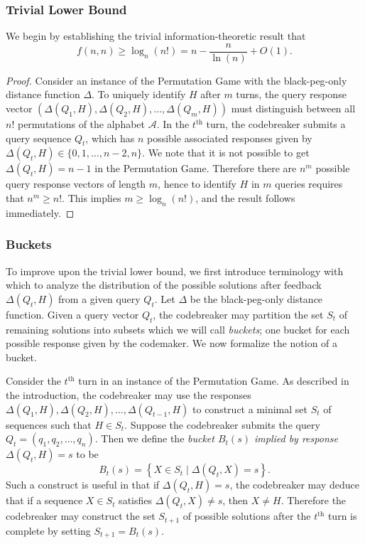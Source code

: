 \documentclass[12pt, a4paper]{article}
\newcommand{\nth}{^{\text{th}}}       %
\begin{document}
	\subsubsection{Trivial Lower Bound}
	We begin by establishing the trivial information-theoretic result that
	\begin{equation*}
		f(n, n)\ge \log_{n}(n!) = n-\frac{n}{\ln(n)}+O(1).
	\end{equation*}
	\begin{proof}
		Consider an instance of the Permutation Game with the black-peg-only distance function $\Delta$. To uniquely identify $H$ after $m$ turns, the query response vector $(\Delta(Q_1, H), \Delta(Q_2, H), \ldots, \Delta(Q_m, H))$ must distinguish between all $n!$ permutations of the alphabet $\mathcal{A}$. In the $t\nth$ turn, the codebreaker submits a query sequence $Q_t$, which has $n$ possible associated responses given by $\Delta(Q_t, H)\in\{0, 1, \ldots, n-2, n\}$. We note that it is not possible to get $\Delta(Q_t, H)=n-1$ in the Permutation Game. Therefore there are $n^m$ possible query response vectors of length $m$, hence to identify $H$ in $m$ queries requires that $n^m\ge n!$. This implies $m\ge\log_n(n!)$, and the result follows immediately.
	\end{proof}

	\subsubsection{Buckets}
	To improve upon the trivial lower bound, we first introduce terminology with which to analyze the distribution of the possible solutions after feedback $\Delta(Q_t, H)$ from a given query $Q_t$. Let $\Delta$ be the black-peg-only distance function. Given a query vector $Q_t$, the codebreaker may partition the set $S_t$ of remaining solutions into subsets which we will call \textit{buckets}; one bucket for each possible response given by the codemaker. We now formalize the notion of a bucket.
	
	Consider the $t\nth$ turn in an instance of the Permutation Game. As described in the introduction, the codebreaker may use the responses $\Delta(Q_1, H), \Delta(Q_2, H), \ldots, \Delta(Q_{t-1}, H)$ to construct a minimal set $S_t$ of sequences such that $H\in S_t$. Suppose the codebreaker submits the query $Q_t = (q_1, q_2, \ldots, q_n)$. Then we define the \textit{bucket $B_t(s)$ implied by response $\Delta(Q_t, H)=s$} to be
	\begin{equation*}
		B_t(s) = \left\{X\in S_t\mid \Delta(Q_t, X) = s\right\}.
	\end{equation*}
	Such a construct is useful in that if $\Delta(Q_t, H) = s$, the codebreaker may deduce that if a sequence $X\in S_t$ satisfies $\Delta(Q_t, X)\neq s$, then $X\neq H$. Therefore the codebreaker may construct the set $S_{t+1}$ of possible solutions after the $t\nth$ turn is complete by setting $S_{t+1} = B_t(s)$.
	
\end{document}
